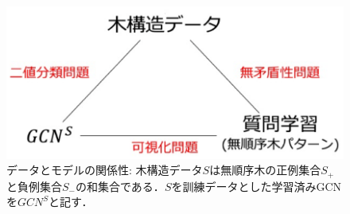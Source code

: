 \begin{figure}[tb]
  \centering
  \includegraphics[scale=0.5]{fig/fig-relation.eps}
  \caption{データとモデルの関係性: 木構造データ$S$は無順序木の正例集合$S_+$と負例集合$S_-$の和集合である．$S$を訓練データとした学習済みGCNを$GCN^S$と記す．}\label{fig:relation}
\end{figure}



